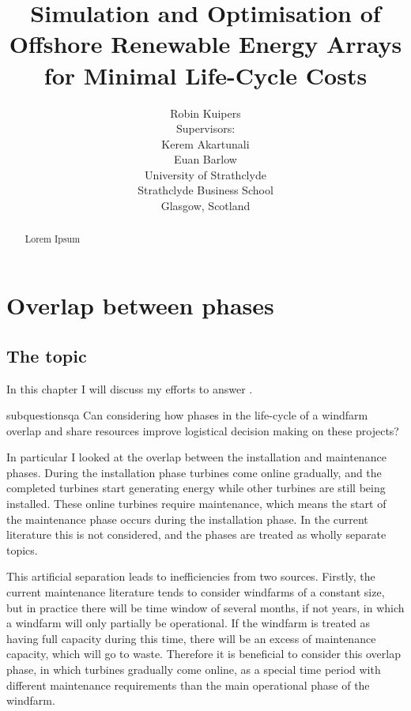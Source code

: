 \documentclass[a4paper,12pt]{report}
\begin{document}
\title{Simulation and Optimisation of Offshore Renewable Energy Arrays for Minimal Life-Cycle Costs}
\author{Robin Kuipers \\[1cm] Supervisors: \\ Kerem Akartunali \\ Euan Barlow\\[2cm] University of Strathclyde \\ Strathclyde Business School \\ {\small Glasgow, Scotland}}

\maketitle

\pagebreak

\begin{abstract}
Lorem Ipsum %
\end{abstract}

\pagebreak

\tableofcontents

\pagebreak

\chapter{Overlap between phases}
\section{The topic}
In this chapter I will discuss my efforts to answer . 

\begin{restatable}{subquestion}{sqa}
\label{sqa}
Can considering how phases in the life-cycle of a windfarm overlap and share resources improve logistical decision making on these projects?
\end{restatable}

In particular I looked at the overlap between the installation and maintenance phases. During the installation phase turbines come online gradually, and the completed turbines start generating energy while other turbines are still being installed. These online turbines require maintenance, which means the start of the maintenance phase occurs during the installation phase. In the current literature this is not considered, and the phases are treated as wholly separate topics. 

This artificial separation leads to inefficiencies from two sources. Firstly, the current maintenance literature tends to consider windfarms of a constant size, but in practice there will be time window of several months, if not years, in which a windfarm will only partially be operational. If the windfarm is treated as having full capacity during this time, there will be an excess of maintenance capacity, which will go to waste. Therefore it is beneficial to consider this overlap phase, in which turbines gradually come online, as a special time period with different maintenance requirements than the main operational phase of the windfarm. 
\end{document}
